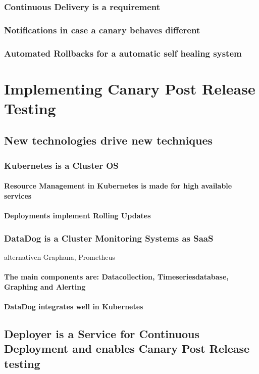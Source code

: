 \subsection{Continuous Delivery is a requirement}
\subsection{Notifications in case a canary behaves different}
\subsection{Automated Rollbacks for a automatic self healing system}

\chapter{Implementing Canary Post Release Testing}
\section{New technologies drive new techniques}
\subsection{Kubernetes is a Cluster OS}
\subsubsection{Resource Management in Kubernetes is made for high available services}
\subsubsection{Deployments implement Rolling Updates}
\subsection{DataDog is a Cluster Monitoring Systems as SaaS}
alternativen Graphana, Prometheus
\subsubsection{The main components are: Datacollection, Timeseriesdatabase, Graphing and Alerting}
\subsubsection{DataDog integrates well in Kubernetes}
\section{Deployer is a Service for Continuous Deployment and enables Canary Post Release testing}
